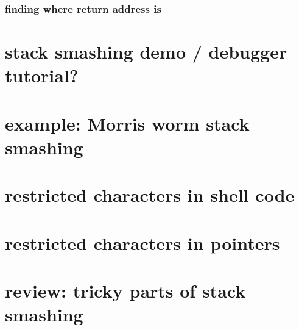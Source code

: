 

\subsubsection{finding where return address is}


\section{stack smashing demo / debugger tutorial?}


\section{example: Morris worm stack smashing}



\section{restricted characters in shell code}
   

\section{restricted characters in pointers}


\section{review: tricky parts of stack smashing}

